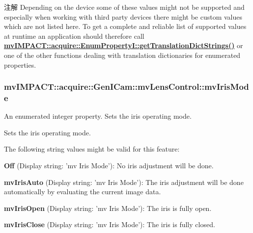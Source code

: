 \begin{DoxyNote}{注解}
Depending on the device some of these values might not be supported and especially when working with third party devices there might be custom values which are not listed here. To get a complete and reliable list of supported values at runtime an application should therefore call {\bfseries \hyperlink{classmv_i_m_p_a_c_t_1_1acquire_1_1_enum_property_i_a0ba6ccbf5ee69784d5d0b537924d26b6}{mv\+I\+M\+P\+A\+C\+T\+::acquire\+::\+Enum\+Property\+I\+::get\+Translation\+Dict\+Strings()}} or one of the other functions dealing with translation dictionaries for enumerated properties. 
\end{DoxyNote}
\hypertarget{classmv_i_m_p_a_c_t_1_1acquire_1_1_gen_i_cam_1_1mv_lens_control_a1838326a8bf847b4a99580a519bcd13f}{
\subsubsection[{mv\+Iris\+Mode}]{ mv\+I\+M\+P\+A\+C\+T\+::acquire\+::\+Gen\+I\+Cam\+::mv\+Lens\+Control\+::mv\+Iris\+Mode}}\label{classmv_i_m_p_a_c_t_1_1acquire_1_1_gen_i_cam_1_1mv_lens_control_a1838326a8bf847b4a99580a519bcd13f}


An enumerated integer property. Sets the iris operating mode. 

Sets the iris operating mode.

The following string values might be valid for this feature\+:
\begin{DoxyItemize}
\item {\bfseries Off} (Display string\+: 'mv Iris Mode')\+: No iris adjustment will be done.
\item {\bfseries mv\+Iris\+Auto} (Display string\+: 'mv Iris Mode')\+: The iris adjustment will be done automatically by evaluating the current image data.
\item {\bfseries mv\+Iris\+Open} (Display string\+: 'mv Iris Mode')\+: The iris is fully open.
\item {\bfseries mv\+Iris\+Close} (Display string\+: 'mv Iris Mode')\+: The iris is fully closed.
\end{DoxyItemize}

